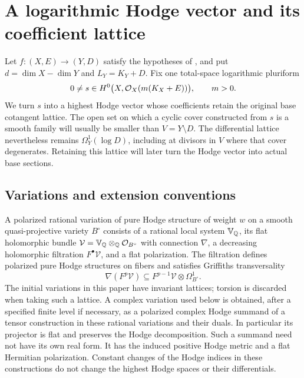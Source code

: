 \section{A logarithmic Hodge vector and its coefficient lattice}
\label{sec:logarithmic-input}

Let $f:(X,E)\to(Y,D)$ satisfy the hypotheses of
, and put $d=\dim X-\dim Y$ and $L_Y=K_Y+D$.
Fix one total-space logarithmic pluriform
\begin{equation}\label{eq:log-input-section}
  0\ne s\in H^0\bigl(X,\mathcal O_X(m(K_X+E))\bigr),\qquad m>0.
\end{equation}
We turn $s$ into a highest Hodge vector whose coefficients retain
the original base cotangent lattice. The open set on which a cyclic
cover constructed from $s$ is a smooth family will usually be smaller
than $V=Y\setminus D$. The differential lattice nevertheless remains
$\Omega_Y^1(\log D)$, including at divisors in $V$ where that cover
degenerates. Retaining this lattice will later turn the Hodge vector
into actual base sections.

\label{sec:preliminaries}
\subsection{Variations and extension conventions}

A polarized rational variation of pure Hodge structure of weight $w$ on a
smooth quasi-projective variety $B^\circ$ consists of a rational local
system $\mathbb V_{\mathbb Q}$, its flat holomorphic bundle
$\mathcal V=\mathbb V_{\mathbb Q}\otimes_{\mathbb Q}\mathcal O_{B^\circ}$ with connection
$\nabla$, a decreasing holomorphic filtration $F^\bullet\mathcal V$,
and a flat polarization.  The filtration defines polarized pure Hodge
structures on fibers and satisfies Griffiths transversality
\[
 \nabla(F^p\mathcal V)\subseteq
 F^{p-1}\mathcal V\otimes\Omega^1_{B^\circ}.
\]
The initial variations in this paper have invariant lattices; torsion is
discarded when taking such a lattice.  A complex variation used below is
obtained, after a specified finite level if necessary, as a polarized
complex Hodge summand of a tensor construction in these rational
variations and their duals.  In particular its projector is flat and
preserves the Hodge decomposition.  Such a summand need not have its own
real form.  It has the induced positive Hodge metric and a flat Hermitian
polarization.  Constant changes of the Hodge indices in these constructions
do not change the highest Hodge spaces or their differentials.

